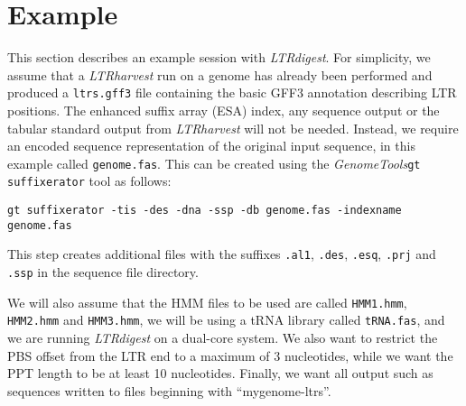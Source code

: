 \documentclass[12pt,titlepage]{article}
\newcommand{\LTRdigest}{\textit{LTRdigest}\xspace}
\newcommand{\GenomeTools}{\textit{GenomeTools}\xspace}
\newcommand{\Gtsuffixerator}{\texttt{gt suffixerator}\xspace}
\begin{document}
\begin{Justshowoptions}



\end{Justshowoptions}

\section{Example}

This section describes an example session with \LTRdigest . For simplicity, we assume that a \emph{LTRharvest} run on a genome has already been performed and produced a \texttt{ltrs.gff3} file containing the basic GFF3 annotation describing LTR positions. The enhanced suffix array (ESA) index, any sequence output or the tabular standard output from \emph{LTRharvest} will not be needed. Instead, we require an encoded sequence representation of the original input sequence, in this example called \texttt{genome.fas}. This can be created using the \GenomeTools \Gtsuffixerator tool as follows:

\texttt{gt suffixerator -tis -des -dna -ssp -db genome.fas -indexname genome.fas}

This step creates additional files with the suffixes \texttt{.al1}, \texttt{.des}, \texttt{.esq}, \texttt{.prj} and \texttt{.ssp} in the sequence file directory.

We will also assume that the HMM files to be used are called \texttt{HMM1.hmm}, \texttt{HMM2.hmm} and \texttt{HMM3.hmm}, we will be using a tRNA library called \texttt{tRNA.fas}, and we are running \LTRdigest on a dual-core system. We also want to restrict the PBS offset from the LTR end to a maximum of 3 nucleotides, while we want the PPT length to be at least 10 nucleotides. Finally, we want all output such as sequences written to files beginning with ``mygenome-ltrs''.
\end{document}
